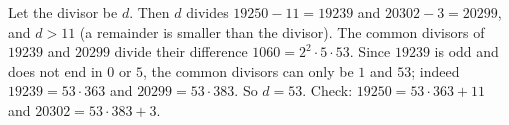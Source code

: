 Let the divisor be $d$. Then $d$ divides $19250-11=19239$ and $20302-3=20299$, and $d>11$ (a remainder is smaller than the divisor). The common divisors of $19239$ and $20299$ divide their difference $1060=2^2\cdot5\cdot53$. Since $19239$ is odd and does not end in $0$ or $5$, the common divisors can only be $1$ and $53$; indeed $19239=53\cdot363$ and $20299=53\cdot383$. So $d=\boxed{53}$. Check: $19250=53\cdot363+11$ and $20302=53\cdot383+3$.
